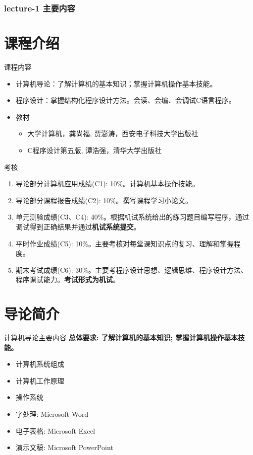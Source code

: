 \begin{frame}
  \frametitle{lecture-1 主要内容}
  \tableofcontents[hideallsubsections]
\end{frame}

\section{课程介绍}

\begin{frame}{课程内容}
\begin{itemize}
	\item 计算机导论：了解计算机的基本知识；掌握计算机操作基本技能。
	\item 程序设计：掌握结构化程序设计方法。会读、会编、会调试C语言程序。
	\item 教材
	\begin{itemize}
		\item 大学计算机，龚尚福, 贾澎涛，西安电子科技大学出版社
		\item C程序设计第五版, 谭浩强，清华大学出版社
	\end{itemize}
\end{itemize}
\end{frame}

\begin{frame}{考核}
\begin{enumerate}
	\item 导论部分计算机应用成绩(C1): 10\%。计算机基本操作技能。
	\item 导论部分课程报告成绩(C2): 10\%。撰写课程学习小论文。
	\item 单元测验成绩(C3、C4): 40\%。根据机试系统给出的练习题目编写程序，通过调试得到正确结果并通过\textbf{机试系统提交}。
	\item 平时作业成绩(C5): 10\%。主要考核对每堂课知识点的复习、理解和掌握程度。
	\item 期末考试成绩(C6): 30\%。主要考程序设计思想、逻辑思维、程序设计方法、程序调试能力。\textbf{考试形式为机试}。
\end{enumerate}
\end{frame}

\section{导论简介}

\begin{frame}{计算机导论主要内容}
\textbf{总体要求: 了解计算机的基本知识; 掌握计算机操作基本技能。}\\
\begin{itemize}
	\item 计算机系统组成
	\item 计算机工作原理
	\item 操作系统
	\item 字处理: Microsoft Word
	\item 电子表格: Microsoft Excel
	\item 演示文稿: Microsoft PowerPoint
\end{itemize}
\end{frame}

